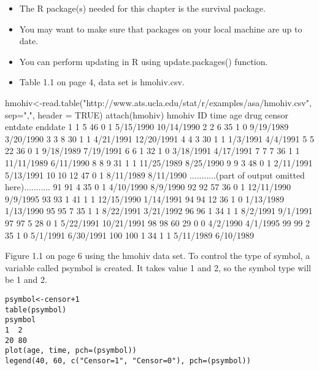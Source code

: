 \begin{frame}[fragile]
	
\begin{itemize}
\item The R package(s) needed for this chapter is the survival package. 
\item You may want to make sure that packages on your local machine are up to date. 
\item You can perform updating in R using update.packages() function.
\item Table 1.1 on page 4, data set is hmohiv.csv.
\end{itemize}


\end{frame}
\begin{frame}[fragile]
 hmohiv<-read.table("http://www.ats.ucla.edu/stat/r/examples/asa/hmohiv.csv", sep=",", header = TRUE)
 attach(hmohiv)
 hmohiv
     ID time age drug censor     entdate     enddate
1     1    5  46    0      1  5/15/1990  10/14/1990 
2     2    6  35    1      0  9/19/1989   3/20/1990 
3     3    8  30    1      1  4/21/1991  12/20/1991 
4     4    3  30    1      1   1/3/1991    4/4/1991 
5     5   22  36    0      1  9/18/1989   7/19/1991 
6     6    1  32    1      0  3/18/1991   4/17/1991 
7     7    7  36    1      1 11/11/1989   6/11/1990 
8     8    9  31    1      1 11/25/1989   8/25/1990 
9     9    3  48    0      1  2/11/1991   5/13/1991 
10   10   12  47    0      1  8/11/1989   8/11/1990 
...........(part of output omitted here)...........
91   91    4  35    0      1  4/10/1990    8/9/1990 
92   92   57  36    0      1 12/11/1990    9/9/1995 
93   93    1  41    1      1 12/15/1990   1/14/1991 
94   94   12  36    1      0  1/13/1989   1/13/1990 
95   95    7  35    1      1  8/22/1991   3/21/1992 
96   96    1  34    1      1   8/2/1991    9/1/1991 
97   97    5  28    0      1  5/22/1991  10/21/1991 
98   98   60  29    0      0   4/2/1990    4/1/1995 
99   99    2  35    1      0   5/1/1991   6/30/1991 
100 100    1  34    1      1  5/11/1989   6/10/1989 
\end{frame}
\begin{frame}[fragile]
Figure 1.1 on page 6 using the hmohiv data set. To control the type of symbol, a variable called psymbol is created. It takes value 1 and 2, so the symbol type will be 1 and 2.
\begin{framed}
\begin{verbatim}
psymbol<-censor+1
table(psymbol)
psymbol
1  2 
20 80 
plot(age, time, pch=(psymbol))
legend(40, 60, c("Censor=1", "Censor=0"), pch=(psymbol))
\end{verbatim}
\end{framed}

\end{frame}
